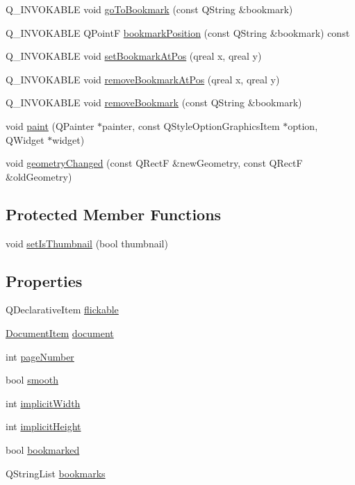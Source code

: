 \begin{DoxyCompactItemize}
\item 
Q\+\_\+\+I\+N\+V\+O\+K\+A\+B\+L\+E void \hyperlink{classPageItem_a799f9e6617c40343d222ffcdca79e04d}{go\+To\+Bookmark} (const Q\+String \&bookmark)
\item 
Q\+\_\+\+I\+N\+V\+O\+K\+A\+B\+L\+E Q\+Point\+F \hyperlink{classPageItem_afe720298c7a93ab422085ac0dcf37972}{bookmark\+Position} (const Q\+String \&bookmark) const 
\item 
Q\+\_\+\+I\+N\+V\+O\+K\+A\+B\+L\+E void \hyperlink{classPageItem_a181d1c800169cdfd2cba40e54ecbee9c}{set\+Bookmark\+At\+Pos} (qreal x, qreal y)
\item 
Q\+\_\+\+I\+N\+V\+O\+K\+A\+B\+L\+E void \hyperlink{classPageItem_ae9fa9318678a6cfe10b18b27d9a81dc5}{remove\+Bookmark\+At\+Pos} (qreal x, qreal y)
\item 
Q\+\_\+\+I\+N\+V\+O\+K\+A\+B\+L\+E void \hyperlink{classPageItem_a1b44dc13d37d45db95f6105860eb1f82}{remove\+Bookmark} (const Q\+String \&bookmark)
\item 
void \hyperlink{classPageItem_a6c529a0195c9b3a1577acfc4dbf1b0db}{paint} (Q\+Painter $\ast$painter, const Q\+Style\+Option\+Graphics\+Item $\ast$option, Q\+Widget $\ast$widget)
\item 
void \hyperlink{classPageItem_a798d865dcd9395cfffa29bb84cec2e0d}{geometry\+Changed} (const Q\+Rect\+F \&new\+Geometry, const Q\+Rect\+F \&old\+Geometry)
\end{DoxyCompactItemize}
\subsection*{Protected Member Functions}
\begin{DoxyCompactItemize}
\item 
void \hyperlink{classPageItem_ac51278c168c00ced0347bc4549b60fa7}{set\+Is\+Thumbnail} (bool thumbnail)
\end{DoxyCompactItemize}
\subsection*{Properties}
\begin{DoxyCompactItemize}
\item 
Q\+Declarative\+Item \hyperlink{classPageItem_af39792e2ec4115ad25422269a02bd1f2}{flickable}
\item 
\hyperlink{classDocumentItem}{Document\+Item} \hyperlink{classPageItem_aeacd9cae2d50dc7f416201020750b7aa}{document}
\item 
int \hyperlink{classPageItem_a01146d83f23d53bca72bfd69373c794a}{page\+Number}
\item 
bool \hyperlink{classPageItem_a790f5adc2ae400da2f113d06e5fbb960}{smooth}
\item 
int \hyperlink{classPageItem_a36e15ae9b525487c1008736d4e5adba7}{implicit\+Width}
\item 
int \hyperlink{classPageItem_a8a1c86f9d73839b632d4618a4884ef53}{implicit\+Height}
\item 
bool \hyperlink{classPageItem_afda223875d28abb3e8dcd8ed02531cec}{bookmarked}
\item 
Q\+String\+List \hyperlink{classPageItem_ae49c1d7d4e63cc5b058d8e834b4b1c81}{bookmarks}
\end{DoxyCompactItemize}
